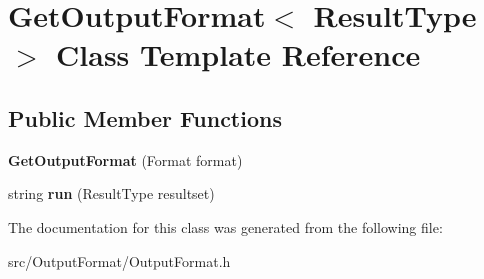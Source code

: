 \hypertarget{class_get_output_format}{\section{Get\-Output\-Format$<$ Result\-Type $>$ Class Template Reference}
\label{class_get_output_format}
}
\subsection*{Public Member Functions}
\begin{DoxyCompactItemize}
\item 
\hypertarget{class_get_output_format_a1f779c91aa5406f465680b31c941fee4}{{\bfseries Get\-Output\-Format} (Format format)}\label{class_get_output_format_a1f779c91aa5406f465680b31c941fee4}

\item 
\hypertarget{class_get_output_format_a11a5a02aebfd3906f51bc552737fff91}{string {\bfseries run} (Result\-Type resultset)}\label{class_get_output_format_a11a5a02aebfd3906f51bc552737fff91}

\end{DoxyCompactItemize}


The documentation for this class was generated from the following file\-:\begin{DoxyCompactItemize}
\item 
src/\-Output\-Format/Output\-Format.\-h\end{DoxyCompactItemize}
